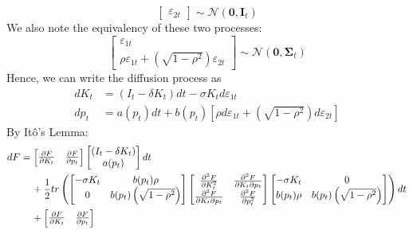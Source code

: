 \documentclass[12pt]{article}
\begin{document}
\begin{itemize}
\[\begin{bmatrix}
    \varepsilon_{2t} 
    \end{bmatrix} \sim \mathcal{N}(\textbf{0}, \textbf{I}_t)\]
    We also note the equivalency of these two processes:
    \[\begin{bmatrix}
    \varepsilon_{1t} \\
    \rho \varepsilon_{1t} + \left(\sqrt{1-\rho^2}\right)\varepsilon_{2t}
    \end{bmatrix} \sim \mathcal{N}(\textbf{0}, \boldsymbol{\Sigma}_t)\]
    Hence, we can write the diffusion process as 
    \[\begin{split}
        dK_t &= (I_t - \delta K_t)dt - \sigma K_t d\varepsilon_{1t} \\
        dp_t &= a(p_t)dt + b(p_t)\left[\rho d\varepsilon_{1t} + \left(\sqrt{1-\rho^2}\right)d\varepsilon_{2t}\right]
    \end{split}\]
    By Itô's Lemma:
    \[\begin{split}
        dF &= \begin{bmatrix}
        \frac{\partial F}{\partial K_t} & \frac{\partial F}{\partial p_t} \\
        \end{bmatrix}\begin{bmatrix}
        (I_t - \delta K_t) \\
        a(p_t)
        \end{bmatrix}dt \\
        &\hspace{4mm}+ \frac{1}{2}tr\left(\begin{bmatrix}
        -\sigma K_t & b(p_t)\rho \\
        0 & b(p_t)\left(\sqrt{1-\rho^2}\right)
        \end{bmatrix}\begin{bmatrix}
        \frac{\partial^2 F}{\partial K_t^2} & \frac{\partial^2 F}{\partial K_t\partial p_t} \\
        \frac{\partial^2 F}{\partial K_t\partial p_t} & \frac{\partial^2 F}{\partial p_t^2}
        \end{bmatrix}\begin{bmatrix}
        -\sigma K_t & 0 \\
        b(p_t)\rho & b(p_t)\left(\sqrt{1-\rho^2}\right)
        \end{bmatrix}\right)dt \\
        &\hspace{4mm}+ \begin{bmatrix}
        \frac{\partial F}{\partial K_t} & \frac{\partial F}{\partial p_t} \\

\end{bmatrix}
\end{split}\]
\end{itemize}
\end{document}
